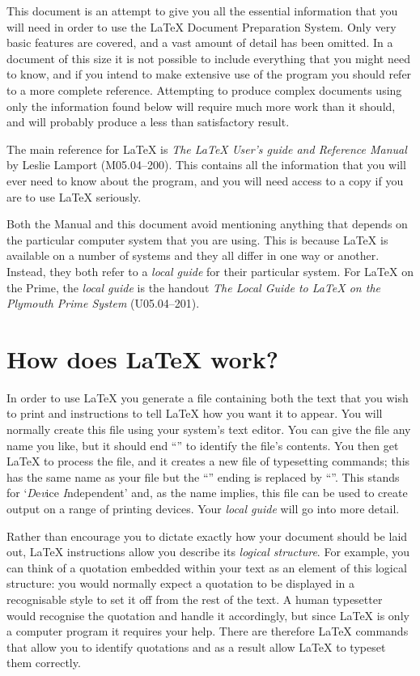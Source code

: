This document is an attempt to give you all the essential
information that you will need in order to use the \LaTeX{} Document
Preparation System.  Only very basic features are covered, and a
vast amount of detail has been omitted.  In a document of this size
it is not possible to include everything that you might need to know,
and if you intend to make extensive use of the program you should
refer to a more complete reference.  Attempting to produce complex
documents using only the information found below will require
much more work than it should, and will probably produce a less
than satisfactory result.

The main reference for \LaTeX{} is {\em The \LaTeX{} User's guide and
Reference Manual\/} by Leslie Lamport (M05.04--200).  This contains
all the information that you will ever need to know about the program,
and you will need access to a copy if you are to use \LaTeX{}
seriously.

Both the Manual and this document avoid mentioning anything that
depends on the particular computer system that you are using.  This is
because \LaTeX{} is available on a number of systems and they all
differ in one way or another.  Instead, they both refer to a {\em local
guide\/} for their particular system.  For \LaTeX{} on the Prime, the
{\em local guide\/} is the handout {\em The Local Guide to \LaTeX{} on
the Plymouth Prime System\/} (U05.04--201).

\section{How does \LaTeX{} work?}

In order to use \LaTeX{} you generate a file containing
both the text that you wish to print and instructions to tell \LaTeX{}
how you want it to appear.  You will normally create
this file using your system's text editor.  You can give the file any name you
like, but it should end ``'' to identify the file's contents.
You then get \LaTeX{} to process the file, and it creates a
new file of typesetting commands; this has the same name as your file but
the ``'' ending is replaced by ``''.  This stands for
`{\it D\/}e{\it v\/}ice {\it I\/}ndependent' and, as the name implies, this file
can be used to create output on a range of printing devices.
Your {\em local guide\/} will go into more detail.

Rather than encourage you to dictate exactly how your document
should be laid out, \LaTeX{} instructions allow you describe its
{\em logical structure\/}.  For example, you can think of a quotation
embedded within your text as an element of this logical structure: you would
normally expect a quotation to be displayed in a recognisable style to set it
off from the rest of the text.
A human typesetter would recognise the quotation and handle
it accordingly, but since \LaTeX{} is only a computer program it requires
your help.  There are therefore \LaTeX{} commands that allow you to
identify quotations and as a result allow \LaTeX{} to typeset them correctly.

